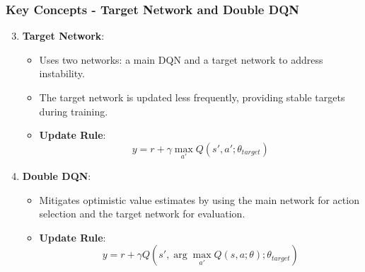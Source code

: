 \documentclass[aspectratio=169]{beamer}
\begin{document}
\begin{frame}[fragile]
    \frametitle{Key Concepts - Target Network and Double DQN}
    \begin{enumerate}
        \setcounter{enumi}{2}
        \item \textbf{Target Network}:
        \begin{itemize}
            \item Uses two networks: a main DQN and a target network to address instability.
            \item The target network is updated less frequently, providing stable targets during training.
            \item \textbf{Update Rule}:
            \begin{equation}
                y = r + \gamma \max_{a'} Q(s', a'; \theta_{target})
            \end{equation}
        \end{itemize}
        
        \item \textbf{Double DQN}:
        \begin{itemize}
            \item Mitigates optimistic value estimates by using the main network for action selection and the target network for evaluation.
            \item \textbf{Update Rule}:
            \begin{equation}
                y = r + \gamma Q(s', \arg\max_{a'} Q(s, a; \theta); \theta_{target})
            \end{equation}
        \end{itemize}
    \end{enumerate}
\end{frame}
\end{document}
